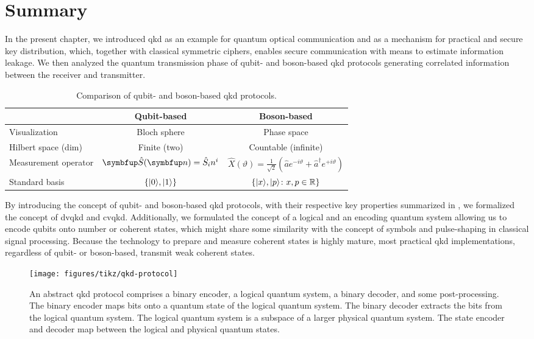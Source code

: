 \section*{Summary}

In the present chapter, we introduced \gls{qkd} as an example for quantum optical communication and as a mechanism for practical and secure key distribution, which, together with classical symmetric ciphers, enables secure communication with means to estimate information leakage.
We then analyzed the quantum transmission phase of qubit- and boson-based \gls{qkd} protocols generating correlated information between the receiver and transmitter.
\begin{table}[htb]
	\centering	
	\begin{tabular}{lcc}
		\toprule
			& Qubit-based & Boson-based \\
		\midrule
			Visualization & Bloch sphere & Phase space \\
			Hilbert space (dim) & Finite (two) & Countable (infinite) \\
			Measurement operator & $\vb{\hat{S}}(\vb{n})=\hat{S}_in^i$ & $\hat{X}(\vartheta)=\frac{1}{\sqrt{2}}\left(\hat{a}e^{-i\vartheta}+\hat{a}^\dagger e^{+i\vartheta}\right)$ \\
			Standard basis & $\left\{\lvert0\rangle,\lvert1\rangle\right\}$ & $\left\{\lvert x\rangle,\lvert p\rangle\colon x,p\in\mathbb{R}\right\}$ \\
		\bottomrule
	\end{tabular}
	\caption{Comparison of qubit- and boson-based \gls{qkd} protocols.}\label{tab:qkd_comparison}
\end{table}
By introducing the concept of qubit- and boson-based \gls{qkd} protocols, with their respective key properties summarized in , we formalized the concept of \gls{dvqkd} and \gls{cvqkd}.
Additionally, we formulated the concept of a logical and an encoding quantum system allowing us to encode qubits onto number or coherent states, which might share some similarity with the concept of symbols and pulse-shaping in classical signal processing.
Because the technology to prepare and measure coherent states is highly mature, most practical \gls{qkd} implementations, regardless of qubit- or boson-based, transmit weak coherent states.
\begin{figure}[htb]
	\centering
	\texttt{[image: figures/tikz/qkd-protocol]}
	\caption{An abstract \gls{qkd} protocol comprises a binary encoder, a logical quantum system, a binary decoder, and some post-processing. The binary encoder maps bits onto a quantum state of the logical quantum system. The binary decoder extracts the bits from the logical quantum system. The logical quantum system is a subspace of a larger physical quantum system. The state encoder and decoder map between the logical and physical quantum states.}\label{fig:qkd_protocol}
\end{figure}
